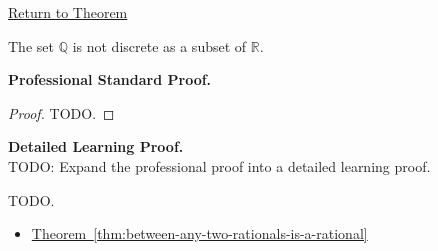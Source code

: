 \newpage
{}
\label{prf:q-not-discrete-in-r}

\begin{remark*}[Return]
\hyperref[cor:q-not-discrete-in-r]{Return to Theorem}
\end{remark*}

\begin{theorem*}
The set $\mathbb{Q}$ is not discrete as a subset of $\mathbb{R}$.
\end{theorem*}

\textbf{Professional Standard Proof.}~\\
\begin{proof}
TODO.
\end{proof}

\textbf{Detailed Learning Proof.}~\\
TODO: Expand the professional proof into a detailed learning proof.


\begin{remark*}
TODO.
\end{remark*}

\begin{dependencies}
\begin{itemize}
  \item \hyperref[thm:between-any-two-rationals-is-a-rational]{Theorem~\ref*{thm:between-any-two-rationals-is-a-rational}}
\end{itemize}
\end{dependencies}

